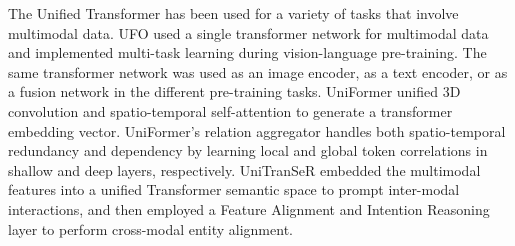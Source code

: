 The Unified Transformer has been used for a variety of tasks that involve multimodal data.
UFO \cite{wang2021ufo} used a single transformer network for multimodal data and implemented multi-task learning during vision-language pre-training. The same transformer network was used as an image encoder, as a text encoder, or as a fusion network in the different pre-training tasks.
UniFormer \cite{li2021uniformer} unified 3D convolution and spatio-temporal self-attention to generate a transformer embedding vector. UniFormer's relation aggregator handles both spatio-temporal redundancy and dependency by learning local and global token correlations in shallow and deep layers, respectively.
UniTranSeR \cite{ma2022unitranser} embedded the multimodal features into a unified Transformer semantic space to prompt inter-modal interactions, and then employed a Feature Alignment and Intention Reasoning layer to perform cross-modal entity alignment.